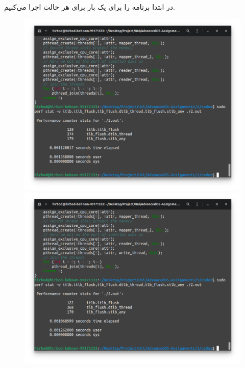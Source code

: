 در ابتدا برنامه را برای یک بار برای هر حالت اجرا می‌کنیم.
\begin{figure}[H]
    \centering
    \includegraphics[scale=0.4]{pics/2-read-read.png}
    \includegraphics[scale=0.4]{pics/2-read-write.png}
\end{figure}
